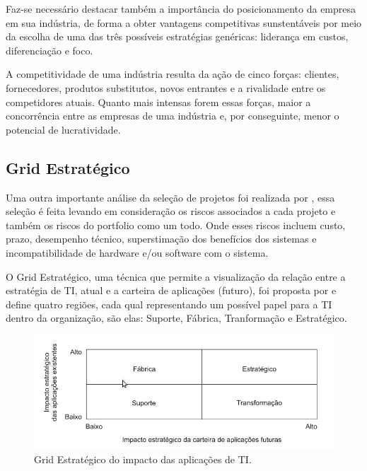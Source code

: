 \documentclass[12pt,a4paper,ruledheader,tocpage=prefix,floatnumber=continuous,pagestart=folhaderosto,font=times]{abnt}
\begin{document}
Faz-se necessário destacar também a importância do posicionamento da empresa em sua indústria, de forma a obter vantagens competitivas sunstentáveis por 
meio da escolha de uma das três possíveis estratégias genéricas: liderança em custos, diferenciação e foco.  

A competitividade de uma indústria resulta da ação de cinco forças: clientes, fornecedores, produtos substitutos, novos entrantes e a rivalidade entre 
os competidores atuais. Quanto mais intensas forem essas forças, maior a concorrência entre as empresas de uma indústria e, por conseguinte, menor o 
potencial de lucratividade.\cite{porter1, porter2} 

\subsection{Grid Estratégico}
Uma outra importante análise da seleção de projetos foi realizada por \cite{mcfarlan}, essa seleção é feita levando em consideração os riscos associados
a cada projeto e também os riscos do portfolio como um todo. Onde esses riscos incluem custo, prazo, desempenho técnico, superstimação dos benefícios 
dos sistemas e incompatibilidade de hardware e/ou software com o sistema. 

O Grid Estratégico, uma técnica que permite a visualização da relação entre a estratégia de TI, atual e a carteira de aplicações (futuro), foi proposta 
por \cite{mcfarlan} e define quatro regiões, cada qual representando um possível papel para a TI dentro da organização, são elas: Suporte, Fábrica, 
Tranformação e Estratégico.

\begin{figure}[H]
\centering
\includegraphics[width=.9\textwidth]{grid_estrategico.jpg}
\caption{Grid Estratégico do impacto das aplicações de TI\cite{mcfarlan}.}
\end{figure} 
\end{document}
